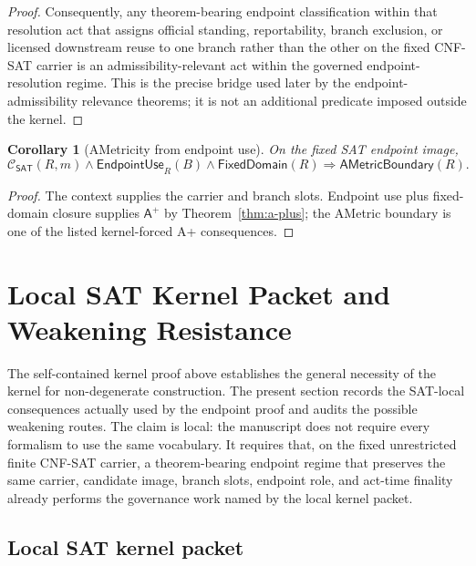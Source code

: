 \documentclass[11pt]{article}
\newtheorem{corollary}[theorem]{Corollary}
\theoremstyle{definition}
\theoremstyle{remark}
\newcommand{\Aplus}{\mathsf{A}^{+}}
\newcommand{\AMetric}{\mathsf{AMetricBoundary}}
\newcommand{\ClayCtx}{\mathcal{C}_{\mathsf{SAT}}(R,m)}
\newcommand{\EndpointUse}{\mathsf{EndpointUse}}
\newcommand{\FixedDom}{\mathsf{FixedDomain}}
\begin{document}
\begin{proof}
Consequently, any theorem-bearing endpoint classification within that resolution act that assigns official standing, reportability, branch exclusion, or licensed downstream reuse to one branch rather than the other on the fixed CNF-SAT carrier is an admissibility-relevant act within the governed endpoint-resolution regime. This is the precise bridge used later by the endpoint-admissibility relevance theorems; it is not an additional predicate imposed outside the kernel.
\end{proof}


\begin{corollary}[AMetricity from endpoint use]\label{cor:context-ametric}
On the fixed SAT endpoint image,
\[
  \ClayCtx\wedge\EndpointUse_R(B)\wedge\FixedDom(R)\Rightarrow \AMetric(R).
\]
\end{corollary}

\begin{proof}
The context supplies the carrier and branch slots. Endpoint use plus fixed-domain closure supplies \(\Aplus\) by Theorem~\ref{thm:a-plus}; the AMetric boundary is one of the listed kernel-forced A+ consequences.
\end{proof}



\section{Local SAT Kernel Packet and Weakening Resistance}\label{sec:local-sat-kernel-packet}

The self-contained kernel proof above establishes the general necessity of the kernel for non-degenerate construction. The present section records the SAT-local consequences actually used by the endpoint proof and audits the possible weakening routes. The claim is local: the manuscript does not require every formalism to use the same vocabulary. It requires that, on the fixed unrestricted finite CNF-SAT carrier, a theorem-bearing endpoint regime that preserves the same carrier, candidate image, branch slots, endpoint role, and act-time finality already performs the governance work named by the local kernel packet.

\subsection{Local SAT kernel packet}
\end{document}
